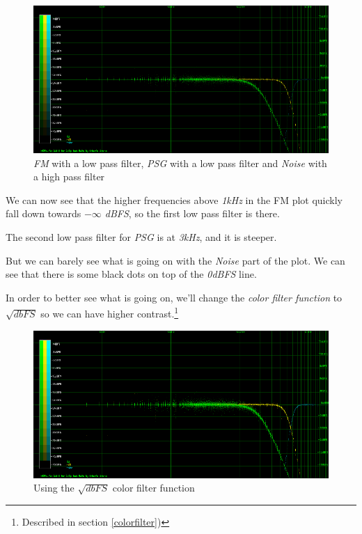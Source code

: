 \documentclass[10pt,a4paper]{report}
\begin{document}
\begin{figure}[H]
	\centering
	\includegraphics[width=1.0\linewidth]{images/interpretation/Plot4-1-All.png}
	\caption[All Plotted]{\textit{FM} with a low pass filter, \textit{PSG} with a low pass filter and \textit{Noise} with a high pass filter}
	\label{fig:plot4-1-all}
\end{figure}

We can now see that the higher frequencies above \textit{1kHz} in the FM plot quickly fall down towards \textit{$-\infty$ dBFS}, so the first low pass filter is there.

The second low pass filter for \textit{PSG} is at \textit{3kHz}, and it is steeper.

But we can barely see what is going on with the \textit{Noise} part of the plot. We can see that there is some black dots on top of the \textit{0dBFS} line.

In order to better see what is going on, we'll change the \textit{color filter function} to $\sqrt{dbFS}$ so we can have higher contrast.\footnote{Described in section \ref{colorfilter})}

\begin{figure}[H]
	\centering
	\includegraphics[width=1.0\linewidth]{images/interpretation/Plot4-2-All-sqrt.png}
	\caption[Using SQRT]{Using the $\sqrt{dbFS}$ color filter function}
	\label{fig:plot4-2-all-sqrt}
\end{figure}
\end{document}
